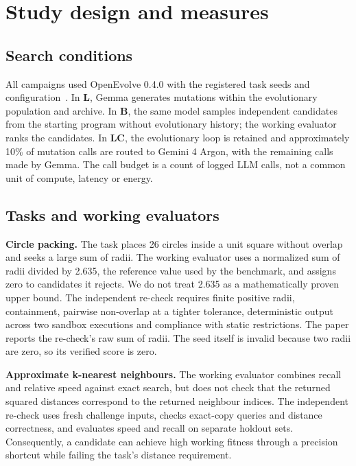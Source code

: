 \documentclass[11pt]{article}
\begin{document}
\section{Study design and measures}\label{sec:design}

\subsection{Search conditions}

All campaigns used OpenEvolve 0.4.0 with the registered task seeds and configuration~\citep{sharma2026openevolve}. In \textbf{L}, Gemma generates mutations within the evolutionary population and archive. In \textbf{B}, the same model samples independent candidates from the starting program without evolutionary history; the working evaluator ranks the candidates. In \textbf{LC}, the evolutionary loop is retained and approximately 10\% of mutation calls are routed to Gemini 4 Argon, with the remaining calls made by Gemma. The call budget is a count of logged LLM calls, not a common unit of compute, latency or energy.

\subsection{Tasks and working evaluators}

\textbf{Circle packing.} The task places 26 circles inside a unit square without overlap and seeks a large sum of radii. The working evaluator uses a normalized sum of radii divided by 2.635, the reference value used by the benchmark, and assigns zero to candidates it rejects. We do not treat 2.635 as a mathematically proven upper bound. The independent re-check requires finite positive radii, containment, pairwise non-overlap at a tighter tolerance, deterministic output across two sandbox executions and compliance with static restrictions. The paper reports the re-check's raw sum of radii. The seed itself is invalid because two radii are zero, so its verified score is zero.

\textbf{Approximate k-nearest neighbours.} The working evaluator combines recall and relative speed against exact search, but does not check that the returned squared distances correspond to the returned neighbour indices. The independent re-check uses fresh challenge inputs, checks exact-copy queries and distance correctness, and evaluates speed and recall on separate holdout sets. Consequently, a candidate can achieve high working fitness through a precision shortcut while failing the task's distance requirement.
\end{document}
